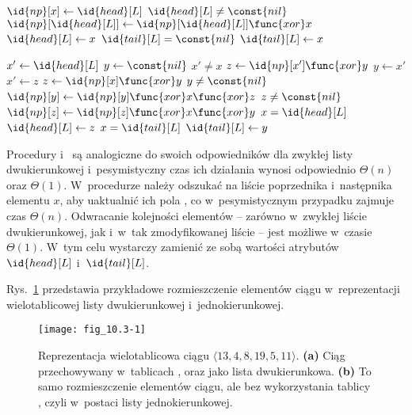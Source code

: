 \begin{codebox}
\li	$\id{np}[x]\gets\id{head}[L]$
\li	\If $\id{head}[L]\ne\const{nil}$
\li		\Then $\id{np}[\id{head}[L]]\gets\id{np}[\id{head}[L]]\func{xor}x$
		\End
\li	$\id{head}[L]\gets x$
\li	\If $\id{tail}[L]=\const{nil}$
\li		\Then $\id{tail}[L]\gets x$
		\End
\end{codebox}

\begin{codebox}
\li	$x'\gets\id{head}[L]$
\li	$y\gets\const{nil}$
\li	\While $x'\ne x$
\li		\Do
			$z\gets\id{np}[x']\func{xor}y$
\li			$y\gets x'$
\li			$x'\gets z$
		\End
\li	$z\gets\id{np}[x]\func{xor}y$
\li	\If $y\ne\const{nil}$
\li		\Then $\id{np}[y]\gets\id{np}[y]\func{xor}x\func{xor}z$
		\End
\li	\If $z\ne\const{nil}$
\li		\Then $\id{np}[z]\gets\id{np}[z]\func{xor}x\func{xor}y$
		\End
\li	\If $x=\id{head}[L]$
\li		\Then $\id{head}[L]\gets z$
		\End
\li	\If $x=\id{tail}[L]$
\li		\Then $\id{tail}[L]\gets y$
		\End
\end{codebox}

Procedury  i~ są analogiczne do swoich odpowiedników dla zwykłej listy dwukierunkowej i~pesymistyczny czas ich działania wynosi odpowiednio $\Theta(n)$ oraz $\Theta(1)$. W~procedurze  należy odszukać na liście poprzednika i~następnika elementu $x$, aby uaktualnić ich pola , co w~pesymistycznym przypadku zajmuje czas $\Theta(n)$. Odwracanie kolejności elementów -- zarówno w~zwykłej liście dwukierunkowej, jak i~w~tak zmodyfikowanej liście -- jest możliwe w~czasie $\Theta(1)$. W~tym celu wystarczy zamienić ze sobą wartości atrybutów $\id{head}[L]$ i~$\id{tail}[L]$.


\exercise %
Rys.~\ref{fig:10.3-1} przedstawia przykładowe rozmieszczenie elementów ciągu w~reprezentacji wielotablicowej listy dwukierunkowej i~jednokierunkowej.
\begin{figure}[ht]
	\begin{center}
		\texttt{[image: fig\_10.3-1]}
	\end{center}
	\caption{Reprezentacja wielotablicowa ciągu $\langle13,4,8,19,5,11\rangle$. {\sffamily\bfseries(a)} Ciąg przechowywany w~tablicach ,  oraz  jako lista dwukierunkowa. {\sffamily\bfseries(b)} To samo rozmieszczenie elementów ciągu, ale bez wykorzystania tablicy , czyli w~postaci listy jednokierunkowej.} \label{fig:10.3-1}
\end{figure}

